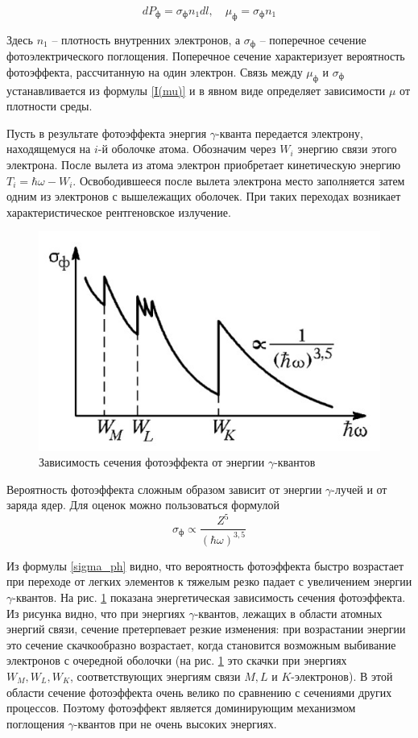 	\begin{equation}
        \label{mu_ph}
	    dP_{\text{ф}} = \sigma_{\text{ф}} n_1 dl, \quad \mu_{\text{ф}} = \sigma_{\text{ф}} n_1
	\end{equation}
	
	Здесь $n_1$ -- плотность внутренних электронов, а $\sigma_{\text{ф}}$ -- поперечное сечение фотоэлектрического поглощения. Поперечное сечение характеризует вероятность фотоэффекта, рассчитанную на один электрон. Связь между $\mu_{\text{ф}}$ и $\sigma_{\text{ф}}$ устанавливается из формулы \eqref{I(mu)} и в явном виде определяет зависимости $\mu$ от плотности среды.
	
	Пусть в результате фотоэффекта энергия $\gamma$-кванта передается электрону, находящемуся на $i$-й оболочке атома. Обозначим через $W_i$
	энергию связи этого электрона. После вылета из атома электрон приобретает кинетическую энергию $T_i = \hbar \omega - W_i$. Освободившееся после вылета электрона место заполняется затем одним из электронов с вышележащих оболочек. При таких переходах возникает характеристическое рентгеновское излучение.

    \begin{figure}[h!]
        \centering
        \includegraphics[width = 8 cm]{images/photo_effect}
        \caption{Зависимость сечения фотоэффекта от энергии $\gamma$-квантов}
        \label{photo_effect}
    \end{figure}
	
	Вероятность фотоэффекта сложным образом зависит от энергии $\gamma$-лучей и от заряда ядер. Для оценок можно пользоваться формулой
	\begin{equation}
        \label{sigma_ph}
	    \sigma_{\text{ф}} \propto \dfrac{Z^5}{(\hbar\omega)^{3,5}}
	\end{equation}
	
	Из формулы \eqref{sigma_ph} видно, что вероятность фотоэффекта быстро возрастает при переходе от легких элементов к тяжелым резко падает с увеличением энергии $\gamma$-квантов. На рис. \ref{photo_effect} показана энергетическая зависимость сечения фотоэффекта. Из рисунка видно, что при энергиях $\gamma$-квантов, лежащих в области атомных энергий связи, сечение претерпевает резкие изменения: при возрастании энергии это сечение скачкообразно возрастает, когда становится возможным выбивание электронов с очередной оболочки (на рис. \ref{photo_effect} это скачки при энергиях $W_M, W_L, W_K$, соответствующих энергиям связи $M, L$  и $K$-электронов). В этой области сечение фотоэффекта очень велико по сравнению с сечениями других процессов. Поэтому фотоэффект является доминирующим механизмом поглощения $\gamma$-квантов при не очень высоких энергиях.
	
